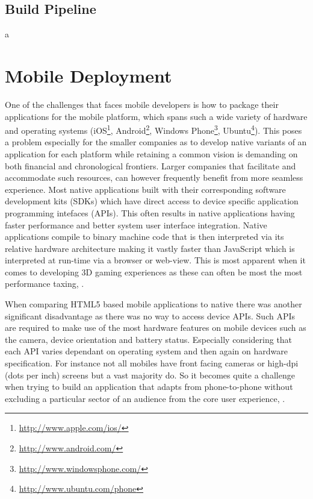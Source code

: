 \documentclass[final]{cmpreport}
\begin{document}
\subsection{Build Pipeline}
a

\section{Mobile Deployment}
One of the challenges that faces mobile developers is how to package their applications for the mobile platform, which spans such a wide variety of hardware and operating systems (iOS\footnote{\url{http://www.apple.com/ios/}}, Android\footnote{\url{http://www.android.com/}}, Windows Phone\footnote{\url{http://www.windowsphone.com/}}, Ubuntu\footnote{\url{http://www.ubuntu.com/phone}}). This poses a problem especially for the smaller companies as to develop native variants of an application for each platform while retaining a common vision is demanding on both financial and chronological frontiers. Larger companies that facilitate and accommodate such resources, can however frequently benefit from more seamless experience. Most native applications built with their corresponding software development kits (SDKs) which have direct access to device specific application programming intefaces (APIs). This often results in native applications having faster performance and better system user interface integration. Native applications compile to binary machine code that is then interpreted via its relative hardware architecture making it vastly faster than JavaScript which is interpreted at run-time via a browser or web-view. This is most apparent when it comes to developing 3D gaming experiences as these can often be most the most performance taxing, \cite{Kulloli}.

When comparing HTML5 based mobile applications to native there was another significant disadvantage as there was no way to access device APIs. Such APIs are required to make use of the most hardware features on mobile devices such as the camera, device orientation and battery status. Especially considering that each API varies dependant on operating system and then again on hardware specification. For instance not all mobiles have front facing cameras or high-dpi (dots per inch) screens but a vast majority do. So it becomes quite a challenge when trying to build an application that adapts from phone-to-phone without excluding a particular sector of an audience from the core user experience, \cite{Charland}.
\end{document}
